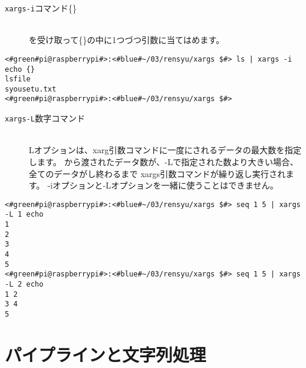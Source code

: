 \begin{description}
\item[\texttt{xargs}\textvisiblespace \texttt{-i}\textvisiblespace コマンド\textvisiblespace \{\}]\mbox{}\\
を受け取って\{\}の中に1つづつ引数に当てはめます。
\end{description}

\begin{lstlisting}[caption=xargsコマンドのオプションi]
<#green#pi@raspberrypi#>:<#blue#~/03/rensyu/xargs $#> ls | xargs -i echo {}
lsfile
syousetu.txt
<#green#pi@raspberrypi#>:<#blue#~/03/rensyu/xargs $#>
\end{lstlisting}

\begin{description}
\item[\texttt{xargs}\textvisiblespace \texttt{-L}\textvisiblespace 数字\textvisiblespace コマンド]\mbox{}\\
Lオプションは、xarg引数コマンドに一度にされるデータの最大数を指定します。
から渡されたデータ数が、-Lで指定された数より大きい場合、全てのデータがし終わるまで xargs引数コマンドが繰り返し実行されます。
-iオプションと-Lオプションを一緒に使うことはできません。
\end{description}

\begin{lstlisting}[caption=xargsコマンドのオプションL]
<#green#pi@raspberrypi#>:<#blue#~/03/rensyu/xargs $#> seq 1 5 | xargs -L 1 echo
1
2
3
4
5
<#green#pi@raspberrypi#>:<#blue#~/03/rensyu/xargs $#> seq 1 5 | xargs -L 2 echo
1 2
3 4
5
\end{lstlisting}

\begin{tcolorbox}[title=\useOmetoi]
\begin{enumerate}
\end{enumerate}
\end{tcolorbox}

\section{パイプラインと文字列処理}

